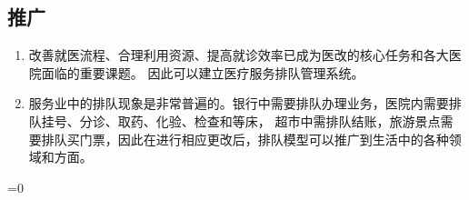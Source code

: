 \documentclass{article}
\begin{document}
\subsection{推广}
\begin{enumerate}
	\item 改善就医流程、合理利用资源、提高就诊效率已成为医改的核心任务和各大医院面临的重要课题。\cite{2} 因此可以建立医疗服务排队管理系统。
	\item 服务业中的排队现象是非常普遍的。银行中需要排队办理业务，医院内需要排队挂号、分诊、取药、化验、检查和等床，\cite{3} 超市中需排队结账，旅游景点需要排队买门票，因此在进行相应更改后，排队模型可以推广到生活中的各种领域和方面。
\end{enumerate}
\ifnum{}=0
	
\end{document}
